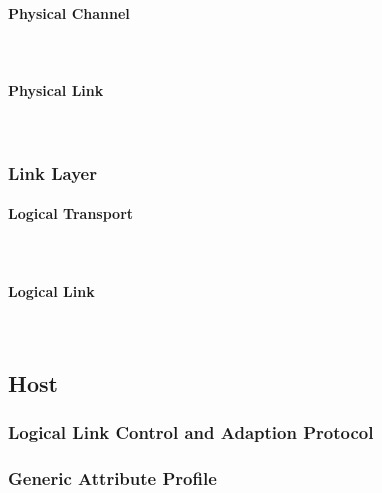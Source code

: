 \documentclass[doktyp=barbeit]{TUBAFarbeiten}
\begin{document}
			\paragraph{Physical Channel} \mbox{} \vspace{0.2cm} \\
				

			\paragraph{Physical Link} \mbox{} \vspace{0.2cm} \\
				

		\subsubsection{Link Layer}
			

			\paragraph{Logical Transport} \mbox{} \vspace{0.2cm} \\
				

			\paragraph{Logical Link} \mbox{} \vspace{0.2cm} \\
				

	\subsection{Host}
		

		\subsubsection{Logical Link Control and Adaption Protocol}
			

		\subsubsection{Generic Attribute Profile}
			
\end{document}
